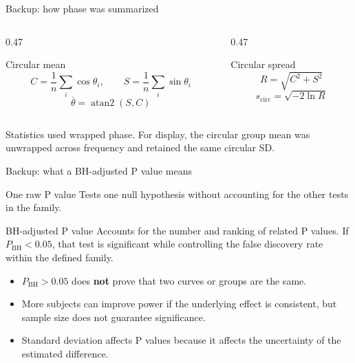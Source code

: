 \documentclass[aspectratio=169,11pt]{beamer}
\begin{document}
\begin{frame}{Backup: how phase was summarized}
    \begin{columns}[T,onlytextwidth]
        \begin{column}{0.47\textwidth}
            \begin{block}{Circular mean}
                \[
                    C=\frac{1}{n}\sum_i\cos\theta_i,
                    \qquad
                    S=\frac{1}{n}\sum_i\sin\theta_i
                \]
                \[
                    \overline\theta=\operatorname{atan2}(S,C)
                \]
            \end{block}
        \end{column}
        \begin{column}{0.47\textwidth}
            \begin{alertblock}{Circular spread}
                \[
                    R=\sqrt{C^2+S^2}
                \]
                \[
                    s_{\mathrm{circ}}=\sqrt{-2\ln R}
                \]
            \end{alertblock}
        \end{column}
    \end{columns}

    \vspace{0.35cm}
    Statistics used wrapped phase. For display, the circular group mean was
    unwrapped across frequency and retained the same circular SD.
\end{frame}

\begin{frame}{Backup: what a BH-adjusted P value means}
    \begin{block}{One raw P value}
        Tests one null hypothesis without accounting for the other tests in
        the family.
    \end{block}

    \begin{alertblock}{BH-adjusted P value}
        Accounts for the number and ranking of related P values. If
        $P_{\mathrm{BH}}<0.05$, that test is significant while controlling the
        false discovery rate within the defined family.
    \end{alertblock}

    \begin{itemize}
        \item $P_{\mathrm{BH}}>0.05$ does \textbf{not} prove that two curves or
        groups are the same.
        \item More subjects can improve power if the underlying effect is
        consistent, but sample size does not guarantee significance.
        \item Standard deviation affects P values because it affects the
        uncertainty of the estimated difference.
    \end{itemize}
\end{frame}
\end{document}
